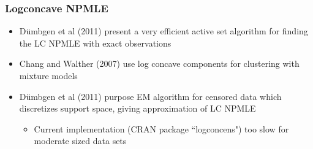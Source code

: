 \documentclass[compress,red]{beamer}
\begin{document}
\begin{frame}

\frametitle{Logconcave NPMLE}

	\begin{itemize}
	
	\item D\"umbgen et al (2011) present a very efficient active set algorithm for finding the LC NPMLE with exact observations
		
	\item Chang and Walther (2007) use log concave components for clustering with mixture models
	
	\item D\"umbgen et al (2011) purpose EM algorithm for censored data which discretizes support space, giving approximation of LC NPMLE
	
		\begin{itemize}
		
		\item Current implementation (CRAN package ``logconcens") too slow for moderate sized data sets
		
		\end{itemize}
	
	\end{itemize}

\end{frame}
\end{document}
